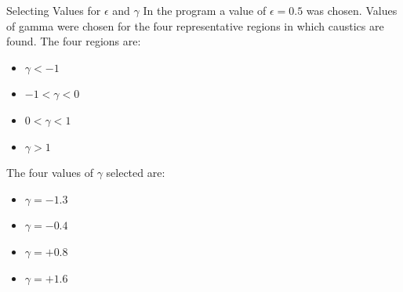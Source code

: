 \documentclass[aspectratio=1610,xcolor=dvipsnames,t]{beamer}
\begin{document}
\begin{frame}{Selecting Values for $\epsilon$ and $\gamma$} 
    In the program a value of $\epsilon = 0.5$ was chosen. Values
    of gamma were chosen for the four representative regions in which
    caustics are found. The four regions are:
    \begin{itemize}
        \item $\gamma < -1$
        \item $-1 < \gamma < 0$
        \item $0 < \gamma < 1$
        \item $\gamma > 1$
    \end{itemize}
    The four values of $\gamma$ selected are:
    \begin{itemize}
        \item $\gamma = -1.3$ 
        \item $\gamma = -0.4$
        \item $\gamma = +0.8$
        \item $\gamma = +1.6$
    \end{itemize}
\end{frame} 

   
\end{document}
